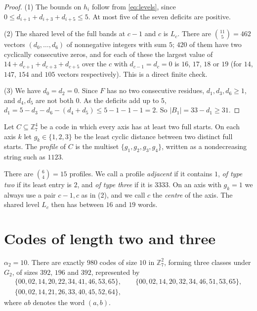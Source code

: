 \documentclass[11pt,colorlinks]{charlie}
\newcommand{\Zs}{\mathbb{Z}_7}
\begin{document}
\begin{proof}
(1) The bounds on $h_i$ follow from \eqref{eq:levels}, since $0\le d_{i+1}+d_{i+3}+d_{i+5}\le5$. At most five of the seven deficits are positive.

(2) The shared level of the full bands at $c-1$ and $c$ is $L_c$. There are $\binom{11}{5}=462$ vectors $(d_0,\dots,d_6)$ of nonnegative integers with sum $5$; $420$ of them have two cyclically consecutive zeros, and for each of these the largest value of $14+d_{c+1}+d_{c+3}+d_{c+5}$ over the $c$ with $d_{c-1}=d_c=0$ is $16$, $17$, $18$ or $19$ (for $14$, $147$, $154$ and $105$ vectors respectively). This is a direct finite check.

(3) We have $d_0=d_2=0$. Since $F$ has no two consecutive residues, $d_1,d_3,d_6\ge1$, and $d_4,d_5$ are not both $0$. As the deficits add up to $5$, $d_1=5-d_3-d_6-(d_4+d_5)\le5-1-1-1=2$. So $|B_1|=33-d_1\ge31$.
\end{proof}

\begin{definition}\label{def:profile}
Let $C\subseteq\Zs^4$ be a code in which every axis has at least two full starts. On each axis $k$ let $g_k\in\{1,2,3\}$ be the least cyclic distance between two distinct full starts. The \emph{profile} of $C$ is the multiset $\{g_1,g_2,g_3,g_4\}$, written as a nondecreasing string such as $1123$.
\end{definition}

There are $\binom{6}{4}=15$ profiles. We call a profile \emph{adjacent} if it contains $1$, \emph{of type two} if its least entry is $2$, and \emph{of type three} if it is $3333$. On an axis with $g_k=1$ we always use a pair $c-1,c$ as in (2), and we call $c$ the \emph{centre} of the axis. The shared level $L_c$ then has between $16$ and $19$ words.

\section{Codes of length two and three}\label{sec:atlas}
\begin{lemma}\label{lem:two}
$\alpha_2=10$. There are exactly $980$ codes of size $10$ in $\Zs^2$, forming three classes under $G_2$, of sizes $392$, $196$ and $392$, represented by
\begin{gather*}
 \{00,02,14,20,22,34,41,46,53,65\},\qquad\{00,02,14,20,32,34,46,51,53,65\},\\
 \{00,02,14,21,26,33,40,45,52,64\},
\end{gather*}
where $ab$ denotes the word $(a,b)$.
\end{lemma}
\end{document}
